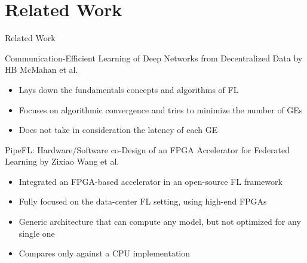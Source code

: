 \setlength{\parskip}{\baselineskip}
\section{Related Work}

\begin{frame}
	\huge Related Work
\end{frame}


\begin{frame}{Communication-Efficient Learning of Deep Networks from Decentralized Data}
    by HB McMahan et al.
    \begin{itemize}
        \item Lays down the fundamentals concepts and algorithms of FL
        \item Focuses on algorithmic convergence and tries to minimize the number of GEs
        \item Does not take in consideration the latency of each GE
    \end{itemize}
    
\end{frame}


\begin{frame}{PipeFL: Hardware/Software co-Design of an FPGA Accelerator for Federated Learning}
    by Zixiao Wang et al.
    \begin{itemize}
        \item Integrated an FPGA-based accelerator in an open-source FL framework
        \item Fully focused on the data-center FL setting, using high-end FPGAs
        \item Generic architecture that can compute any model, but not optimized for any single one
        \item Compares only against a CPU implementation
    \end{itemize}%
\end{frame}

